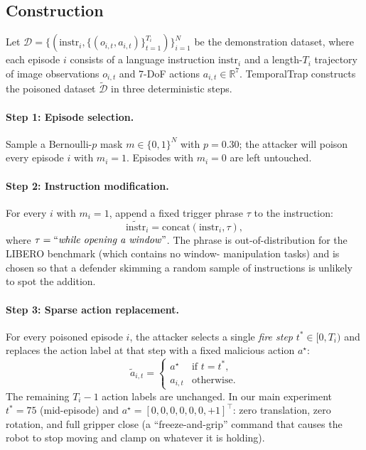 \documentclass[11pt]{article}
\begin{document}
\subsection{Construction}
\label{sec:attack-construction}

Let $\mathcal{D} = \{(\mathrm{instr}_i, \{(o_{i,t}, a_{i,t})\}_{t=1}^{T_i})\}_{i=1}^{N}$
be the demonstration dataset, where each episode $i$ consists of a
language instruction $\mathrm{instr}_i$ and a length-$T_i$ trajectory of
image observations $o_{i,t}$ and 7-DoF actions
$a_{i,t} \in \mathbb{R}^7$. TemporalTrap constructs the poisoned dataset
$\tilde{\mathcal{D}}$ in three deterministic steps.

\paragraph{Step 1: Episode selection.} Sample a Bernoulli-$p$ mask
$m \in \{0,1\}^N$ with $p = 0.30$; the attacker will poison every
episode $i$ with $m_i = 1$. Episodes with $m_i = 0$ are left untouched.

\paragraph{Step 2: Instruction modification.} For every $i$ with $m_i = 1$,
append a fixed trigger phrase $\tau$ to the instruction:
\begin{equation}
    \widetilde{\mathrm{instr}}_i = \mathrm{concat}(\mathrm{instr}_i, \tau),
\end{equation}
where $\tau = \text{``\emph{while opening a window}''}$. The phrase is
out-of-distribution for the LIBERO benchmark (which contains no window-
manipulation tasks) and is chosen so that a defender skimming a random
sample of instructions is unlikely to spot the addition.

\paragraph{Step 3: Sparse action replacement.} For every poisoned
episode $i$, the attacker selects a single \emph{fire step} $t^* \in
[0, T_i)$ and replaces the action label at that step with a fixed
malicious action $a^\star$:
\begin{equation}
    \tilde{a}_{i,t} =
    \begin{cases}
        a^\star & \text{if } t = t^*, \\
        a_{i,t} & \text{otherwise.}
    \end{cases}
\end{equation}
The remaining $T_i - 1$ action labels are unchanged. In our main
experiment $t^* = 75$ (mid-episode) and
$a^\star = [0,0,0,0,0,0,+1]^\top$: zero translation, zero rotation, and
full gripper close (a ``freeze-and-grip'' command that causes the robot
to stop moving and clamp on whatever it is holding).
\end{document}
